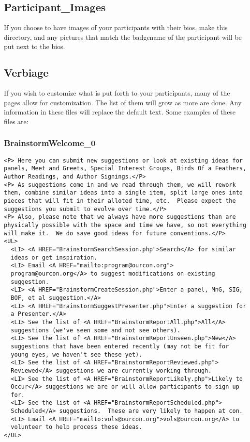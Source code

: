 \documentclass[tablesignature]{scrartcl}
\begin{document}
\subsection{Participant\_{}Images}
\label{sec-3_4}

     If you choose to have images of your participants with their
     bios, make this directory, and any pictures that match the
     badgename of the participant will be put next to the bios.
\subsection{Verbiage}
\label{sec-3_5}

     If you wish to customize what is put forth to your participants,
     many of the pages allow for customization.  The list of them will
     grow as more are done.  Any information in these files will
     replace the default text.  Some examples of these files are:
\subsubsection{BrainstormWelcome\_{}0}
\label{sec-3_5_1}

\begin{verbatim}
<P> Here you can submit new suggestions or look at existing ideas for
panels, Meet and Greets, Special Interest Groups, Birds Of a Feathers,
Author Readings, and Author Signings.</P>
<P> As suggestions come in and we read through them, we will rework
them, combine similar ideas into a single item, split large ones into
pieces that will fit in their alloted time, etc.  Please expect the
suggestions you submit to evolve over time.</P>
<P> Also, please note that we always have more suggestions than are
physically possible with the space and time we have, so not everything
will make it.  We do save good ideas for future conventions.</P>
<UL> 
  <LI> <A HREF="BrainstormSearchSession.php">Search</A> for similar
  ideas or get inspiration.
  <LI> Email <A HREF="mailto:program@ourcon.org">
  program@ourcon.org</A> to suggest modifications on existing
  suggestion.
  <LI> <A HREF="BrainstormCreateSession.php">Enter a panel, MnG, SIG,
  BOF, et al suggestion.</A>
  <LI> <A HREF="BrainstormSuggestPresenter.php">Enter a suggestion for
  a Presenter.</A>
  <LI> See the list of <A HREF="BrainstormReportAll.php">All</A>
  suggestions (we've seen some and not see others).
  <LI> See the list of <A HREF="BrainstormReportUnseen.php">New</A>
  suggestions that have been entered recently (may not be fit for
  young eyes, we haven't see these yet).
  <LI> See the list of <A HREF="BrainstormReportReviewed.php">
  Reviewed</A> suggestions we are currently working through.
  <LI> See the list of <A HREF="BrainstormReportLikely.php">Likely to
  Occur</A> suggestions we are or will allow participants to sign up
  for.
  <LI> See the list of <A HREF="BrainstormReportScheduled.php">
  Scheduled</A> suggestions.  These are very likely to happen at con.
  <LI> Email <A HREF="mailto:vols@ourcon.org">vols@ourcon.org</A> to
  volunteer to help process these ideas.
</UL>
\end{verbatim}
\end{document}
